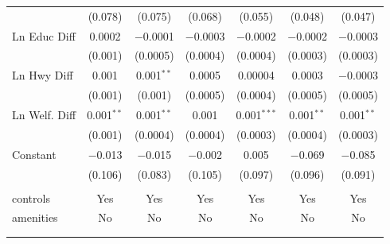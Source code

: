 \begin{table}[!htbp]
\begin{tabular}{@{\extracolsep{5pt}}lcccccc}
  & (0.078) & (0.075) & (0.068) & (0.055) & (0.048) & (0.047) \\ 
  Ln Educ Diff & 0.0002 & $-$0.0001 & $-$0.0003 & $-$0.0002 & $-$0.0002 & $-$0.0003 \\ 
  & (0.001) & (0.0005) & (0.0004) & (0.0004) & (0.0003) & (0.0003) \\ 
  Ln Hwy Diff & 0.001 & 0.001$^{**}$ & 0.0005 & 0.00004 & 0.0003 & $-$0.0003 \\ 
  & (0.001) & (0.001) & (0.0005) & (0.0004) & (0.0005) & (0.0005) \\ 
  Ln Welf. Diff & 0.001$^{**}$ & 0.001$^{**}$ & 0.001 & 0.001$^{***}$ & 0.001$^{**}$ & 0.001$^{**}$ \\ 
  & (0.001) & (0.0004) & (0.0004) & (0.0003) & (0.0004) & (0.0003) \\ 
  Constant & $-$0.013 & $-$0.015 & $-$0.002 & 0.005 & $-$0.069 & $-$0.085 \\ 
  & (0.106) & (0.083) & (0.105) & (0.097) & (0.096) & (0.091) \\ 
 \hline \\[-1.8ex] 
controls & Yes & Yes & Yes & Yes & Yes & Yes \\ 
amenities & No & No & No & No & No & No \\ 
\hline \\[-1.8ex] 
\hline 
\hline \\[-1.8ex] 
\end{tabular} 
\end{table} 
